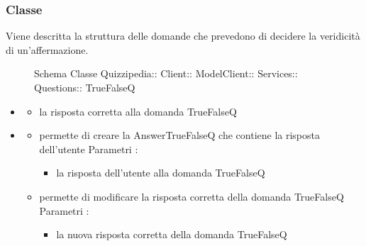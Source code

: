 \subsubsection{Classe }
Viene descritta la struttura delle domande che prevedono di decidere la veridicità di un'affermazione.
\begin{figure}[H]
\centering
\noindent{}
\caption[Schema Classe TrueFalseQ]{Schema Classe Quizzipedia:: Client:: ModelClient:: Services:: Questions:: TrueFalseQ}
\end{figure}
\begin{itemize}
\item {}
\begin{itemize}
\item {}
\newline
la risposta corretta alla domanda TrueFalseQ
\end{itemize}
\item {}
\begin{itemize}
\item {}
\newline
permette di creare la AnswerTrueFalseQ che contiene la risposta dell'utente
\newline
Parametri :
\begin{itemize}
\item {}
\newline
la risposta dell'utente alla domanda TrueFalseQ
\end{itemize}
\item {}
\newline
permette di modificare la risposta corretta della domanda TrueFalseQ
\newline
Parametri :
\begin{itemize}
\item {}
\newline
la nuova risposta corretta della domanda TrueFalseQ
\end{itemize}
\end{itemize}
\end{itemize}
